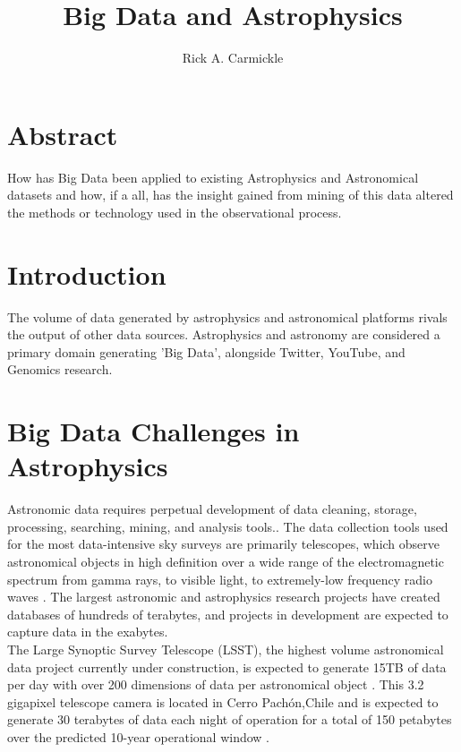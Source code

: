 \documentclass[letterpaper]{report}
\begin{document}
\title{Big Data and Astrophysics}
\author{Rick A. Carmickle}
\maketitle


\section{Abstract}
How has Big Data been applied to existing Astrophysics and Astronomical datasets and how, if a all, has the insight gained from mining of this data altered the methods or technology used in the observational process.

\section{Introduction}
The volume of data generated by astrophysics and astronomical platforms rivals the output of other data sources. Astrophysics and astronomy are considered a primary domain generating 'Big Data', alongside Twitter, YouTube, and Genomics research.\cite{Stephens2015} 

\section{Big Data Challenges in Astrophysics}
Astronomic data requires perpetual development of data cleaning, storage, processing, searching, mining, and analysis tools.\cite{Borne2014}. The data collection tools used for the most data-intensive sky surveys are primarily telescopes, which observe astronomical objects in high definition over a wide range of the electromagnetic spectrum from gamma rays, to visible light, to extremely-low frequency radio waves \cite{DR12017}. The largest astronomic and astrophysics research projects have created databases of hundreds of terabytes, and projects in development are expected to capture data in the exabytes\cite{Newman2011,Trader2014,Zhang2015}. \\

The Large Synoptic Survey Telescope (LSST), the highest volume astronomical data project currently under construction, is expected to generate 15TB of data per day with over 200 dimensions of data per astronomical object \cite{LSSTRank}. This 3.2 gigapixel telescope camera is located in Cerro Pachón,Chile and is expected to generate 30 terabytes of data each night of operation for a total of 150 petabytes over the predicted 10-year operational window \cite{EPO}. \\ 
\end{document}
